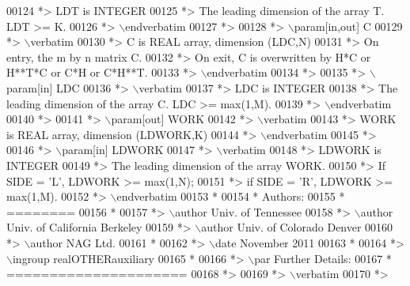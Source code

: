 \begin{DoxyCode}
00124 \textcolor{comment}{*>          LDT is INTEGER}
00125 \textcolor{comment}{*>          The leading dimension of the array T. LDT >= K.}
00126 \textcolor{comment}{*> \(\backslash\)endverbatim}
00127 \textcolor{comment}{*>}
00128 \textcolor{comment}{*> \(\backslash\)param[in,out] C}
00129 \textcolor{comment}{*> \(\backslash\)verbatim}
00130 \textcolor{comment}{*>          C is REAL array, dimension (LDC,N)}
00131 \textcolor{comment}{*>          On entry, the m by n matrix C.}
00132 \textcolor{comment}{*>          On exit, C is overwritten by H*C or H**T*C or C*H or C*H**T.}
00133 \textcolor{comment}{*> \(\backslash\)endverbatim}
00134 \textcolor{comment}{*>}
00135 \textcolor{comment}{*> \(\backslash\)param[in] LDC}
00136 \textcolor{comment}{*> \(\backslash\)verbatim}
00137 \textcolor{comment}{*>          LDC is INTEGER}
00138 \textcolor{comment}{*>          The leading dimension of the array C. LDC >= max(1,M).}
00139 \textcolor{comment}{*> \(\backslash\)endverbatim}
00140 \textcolor{comment}{*>}
00141 \textcolor{comment}{*> \(\backslash\)param[out] WORK}
00142 \textcolor{comment}{*> \(\backslash\)verbatim}
00143 \textcolor{comment}{*>          WORK is REAL array, dimension (LDWORK,K)}
00144 \textcolor{comment}{*> \(\backslash\)endverbatim}
00145 \textcolor{comment}{*>}
00146 \textcolor{comment}{*> \(\backslash\)param[in] LDWORK}
00147 \textcolor{comment}{*> \(\backslash\)verbatim}
00148 \textcolor{comment}{*>          LDWORK is INTEGER}
00149 \textcolor{comment}{*>          The leading dimension of the array WORK.}
00150 \textcolor{comment}{*>          If SIDE = 'L', LDWORK >= max(1,N);}
00151 \textcolor{comment}{*>          if SIDE = 'R', LDWORK >= max(1,M).}
00152 \textcolor{comment}{*> \(\backslash\)endverbatim}
00153 \textcolor{comment}{*}
00154 \textcolor{comment}{*  Authors:}
00155 \textcolor{comment}{*  ========}
00156 \textcolor{comment}{*}
00157 \textcolor{comment}{*> \(\backslash\)author Univ. of Tennessee }
00158 \textcolor{comment}{*> \(\backslash\)author Univ. of California Berkeley }
00159 \textcolor{comment}{*> \(\backslash\)author Univ. of Colorado Denver }
00160 \textcolor{comment}{*> \(\backslash\)author NAG Ltd. }
00161 \textcolor{comment}{*}
00162 \textcolor{comment}{*> \(\backslash\)date November 2011}
00163 \textcolor{comment}{*}
00164 \textcolor{comment}{*> \(\backslash\)ingroup realOTHERauxiliary}
00165 \textcolor{comment}{*}
00166 \textcolor{comment}{*> \(\backslash\)par Further Details:}
00167 \textcolor{comment}{*  =====================}
00168 \textcolor{comment}{*>}
00169 \textcolor{comment}{*> \(\backslash\)verbatim}
00170 \textcolor{comment}{*>}

\end{DoxyCode}
